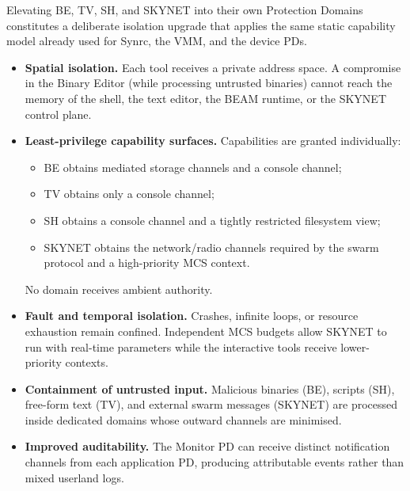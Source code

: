 \documentclass{article}
\begin{document}
Elevating BE, TV, SH, and SKYNET into their own Protection Domains constitutes
a deliberate isolation upgrade that applies the same static capability model
already used for Synrc, the VMM, and the device PDs.

\begin{itemize}[leftmargin=*]
  \item \textbf{Spatial isolation.}  
        Each tool receives a private address space. A compromise in the Binary
        Editor (while processing untrusted binaries) cannot reach the memory of
        the shell, the text editor, the BEAM runtime, or the SKYNET control
        plane.

  \item \textbf{Least-privilege capability surfaces.}  
        Capabilities are granted individually:
        \begin{itemize}
          \item BE obtains mediated storage channels and a console channel;
          \item TV obtains only a console channel;
          \item SH obtains a console channel and a tightly restricted filesystem
                view;
          \item SKYNET obtains the network/radio channels required by the swarm
                protocol and a high-priority MCS context.
        \end{itemize}
        No domain receives ambient authority.

  \item \textbf{Fault and temporal isolation.}  
        Crashes, infinite loops, or resource exhaustion remain confined.
        Independent MCS budgets allow SKYNET to run with real-time parameters
        while the interactive tools receive lower-priority contexts.

  \item \textbf{Containment of untrusted input.}  
        Malicious binaries (BE), scripts (SH), free-form text (TV), and external
        swarm messages (SKYNET) are processed inside dedicated domains whose
        outward channels are minimised.

  \item \textbf{Improved auditability.}  
        The Monitor PD can receive distinct notification channels from each
        application PD, producing attributable events rather than mixed
        userland logs.
\end{itemize}
\end{document}
